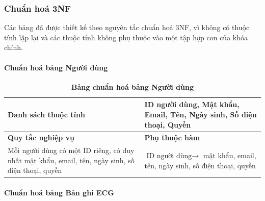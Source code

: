 \subsubsection{Chuẩn hoá 3NF}
Các bảng đã được thiết kế theo nguyên tắc chuẩn hoá 3NF, vì không có thuộc tính lặp lại và các thuộc tính không phụ thuộc vào một tập hợp con của khóa chính.

\paragraph{Chuẩn hoá bảng Người dùng}
\mbox{}

\begin{table}[H]
  \caption{\bfseries \fontsize{12pt}{0pt}\selectfont Bảng chuẩn hoá bảng Người dùng}
  \centering
  \begin{tabularx}{0.9\textwidth}{|X|X|}
    \hline
    \textbf{Danh sách thuộc tính} & ID người dùng, Mật khẩu, Email, Tên, Ngày sinh, Số điện thoại,
    Quyền \\ %
    \hline
    \textbf{Quy tắc nghiệp vụ} & \textbf{Phụ thuộc hàm} \\
    \hline
    Mỗi người dùng có một ID riêng, có duy nhất mật khẩu, email, tên, ngày sinh, số điện thoại,
    quyền & \parbox[t]{\linewidth}{$\text{ID người dùng} \rightarrow$ mật khẩu, email, tên, ngày sinh, số điện thoại, quyền} \\
    \hline
     \\
     \\
    \hline
  \end{tabularx}
\end{table}


\paragraph{Chuẩn hoá bảng Bản ghi ECG}
\mbox{}


